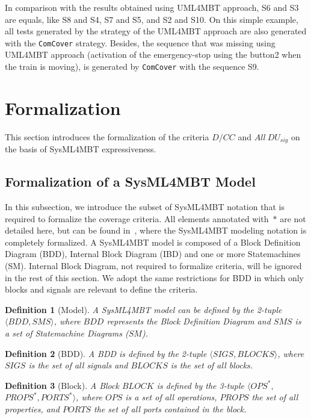 \documentclass{llncs}
\newtheorem{de}{Definition}
\begin{document}
In comparison with the results obtained using UML4MBT approach, S6 and S3 are
equals, like S8 and S4, S7 and S5, and S2 and S10. 
On this simple example, all
tests generated by the strategy of the UML4MBT approach are also generated with
the \texttt{ComCover} strategy.
Besides, the sequence that was missing using
UML4MBT approach (activation of the emergency-stop using the
button2 when the train is moving), is generated by \texttt{ComCover}
with the sequence S9.
\vspace*{-.25cm}
\section{Formalization}
\label{formalization}\vspace*{-.25cm}
This section introduces the formalization of the criteria $D/CC$
and $All~DU_{sig}$ on the basis of SysML4MBT
expressiveness. 
\vspace*{-.25cm}
\subsection{Formalization of a SysML4MBT Model}
\vspace*{-.25cm}
In this subsection, we introduce the subset of SysML4MBT
notation that is required to formalize the coverage criteria. All
elements annotated with~$*$ are not detailed here, but can be found 
in~\cite{UMLFM10}, where the SysML4MBT modeling notation is
completely formalized. 
A SysML4MBT model is composed of a Block Definition Diagram (BDD),
Internal Block Diagram (IBD) and one or more Statemachines
(SM). Internal Block Diagram, not required to formalize criteria, will
be ignored in the rest of this section. We adopt the same restrictions
for BDD in which only blocks and signals are relevant to define the
criteria.

 \begin{de}[Model]
A SysML4MBT model can be defined by the 2-tuple $\langle BDD,SMS
\rangle$, where $BDD$ represents the Block Definition Diagram and $SMS$
is a set of Statemachine Diagrams ($SM$). 
\end{de}

\begin{de}[BDD]
A BDD is defined by the 2-tuple $\langle SIGS,BLOCKS \rangle$,
where $SIGS$ is the set of all signals and $BLOCKS$ is the set
of all blocks. 
\end{de}

\begin{de}[Block]
A Block $BLOCK$ is defined by the 3-tuple $\langle OPS^*,$ \linebreak
$PROPS^*, PORTS^*\rangle$, where $OPS$ is a set of all operations,
$PROPS$ the set of all properties, and $PORTS$ the set of all ports
contained in the block.
\end{de}
\end{document}
